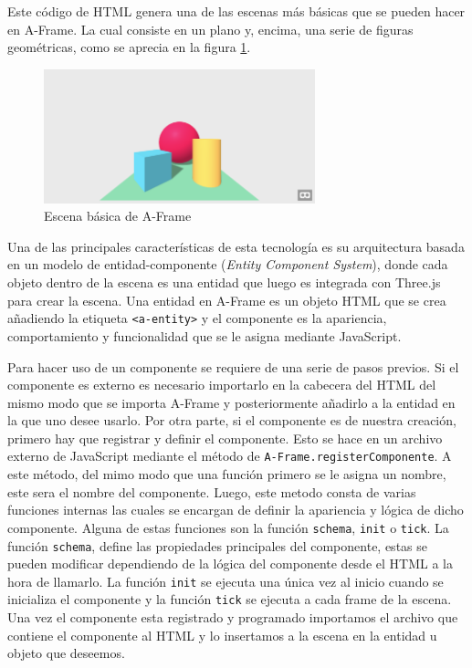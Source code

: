 \documentclass[a4paper, 12pt]{book}
\begin{document}
Este código de HTML genera una de las escenas más básicas que se pueden hacer en A-Frame. La cual consiste en un plano y, encima, una serie de figuras geométricas, como se aprecia en la figura \ref{fig:aframe-basic}.

\begin{figure}[H]  
  \centering
  \includegraphics[width=0.7\textwidth]{img/aframe_hello_world.png}
  \caption{Escena básica de A-Frame}
  \label{fig:aframe-basic}
\end{figure}

Una de las principales características de esta tecnología es su arquitectura basada en un modelo de entidad-componente (\textit{Entity Component System}), donde cada objeto dentro de la escena es una entidad que luego es integrada con Three.js para crear la escena.
Una entidad en A-Frame es un objeto HTML que se crea añadiendo la etiqueta \texttt{<a-entity>} y el componente es la apariencia, comportamiento y funcionalidad que se le asigna mediante JavaScript. 

Para hacer uso de un componente se requiere de una serie de pasos previos. Si el componente es externo es necesario importarlo en la cabecera del HTML del mismo modo que se importa A-Frame y posteriormente añadirlo a la entidad en la que uno desee usarlo.
Por otra parte, si el  componente es de nuestra creación, primero hay que registrar y definir el componente. Esto se hace en un archivo externo de JavaScript mediante el método de \texttt{A-Frame.registerComponente}. A este método, del mimo modo que una función primero se le asigna un nombre, 
este sera el nombre del componente. Luego, este metodo consta de varias funciones internas las cuales se encargan de definir la apariencia y lógica de dicho componente. Alguna de estas funciones son la función \texttt{schema}, \texttt{init} o \texttt{tick}.
La función \texttt{schema}, define las propiedades principales del componente, estas se pueden modificar dependiendo de la lógica del componente desde el HTML a la hora de llamarlo. La función \texttt{init} se ejecuta una única vez al inicio cuando se inicializa el componente y la función \texttt{tick} se ejecuta a cada frame de la escena.
Una vez el componente esta registrado y programado importamos el archivo que contiene el componente al HTML y lo insertamos a la escena en la entidad u objeto que deseemos. 
\end{document}
